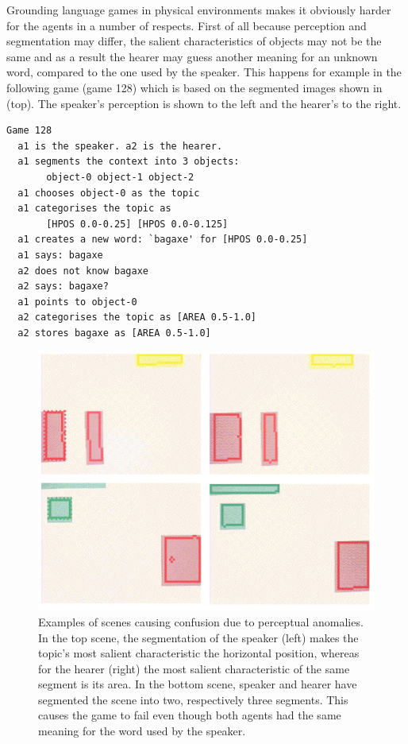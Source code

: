 Grounding language games in physical environments
makes it obviously harder
for the agents in a number of respects. First of 
all because perception and segmentation may differ, 
the salient characteristics of objects may not be the same
and as a result the hearer may guess another meaning for an 
unknown word, compared to 
the one used by the speaker. This happens for
example in the following game (game 128) which is based on 
the segmented images shown in  (top). The
speaker's perception is shown to the left and the 
hearer's to the right. 
\begin{verbatim}
Game 128
  a1 is the speaker. a2 is the hearer. 
  a1 segments the context into 3 objects: 
       object-0 object-1 object-2
  a1 chooses object-0 as the topic 
  a1 categorises the topic as 
       [HPOS 0.0-0.25] [HPOS 0.0-0.125]
  a1 creates a new word: `bagaxe' for [HPOS 0.0-0.25]
  a1 says: bagaxe
  a2 does not know bagaxe
  a2 says: bagaxe?
  a1 points to object-0
  a2 categorises the topic as [AREA 0.5-1.0]
  a2 stores bagaxe as [AREA 0.5-1.0]
\end{verbatim}


\begin{figure}
\begin{center}
\includegraphics[width=0.8\columnwidth]{chap7/figs/plate-16}
\end{center}
\caption{ Examples of scenes causing confusion
due to perceptual anomalies. In the top scene, 
the segmentation of the speaker (left) makes the 
topic's most salient characteristic the horizontal
position, whereas for the hearer (right) the most salient
characteristic of the same segment is its area. In the 
bottom scene, speaker and hearer have segmented the 
scene into two, respectively three segments. This 
causes the game to fail even though both agents 
had the same meaning for the word used by the speaker.}
\label{fig:plate-16}
\end{figure}

